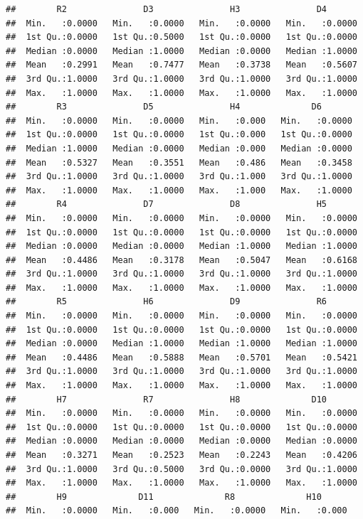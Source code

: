 \documentclass[
]{book}
\begin{document}
\begin{verbatim}
##        R2               D3               H3               D4        
##  Min.   :0.0000   Min.   :0.0000   Min.   :0.0000   Min.   :0.0000  
##  1st Qu.:0.0000   1st Qu.:0.5000   1st Qu.:0.0000   1st Qu.:0.0000  
##  Median :0.0000   Median :1.0000   Median :0.0000   Median :1.0000  
##  Mean   :0.2991   Mean   :0.7477   Mean   :0.3738   Mean   :0.5607  
##  3rd Qu.:1.0000   3rd Qu.:1.0000   3rd Qu.:1.0000   3rd Qu.:1.0000  
##  Max.   :1.0000   Max.   :1.0000   Max.   :1.0000   Max.   :1.0000  
##        R3               D5               H4              D6        
##  Min.   :0.0000   Min.   :0.0000   Min.   :0.000   Min.   :0.0000  
##  1st Qu.:0.0000   1st Qu.:0.0000   1st Qu.:0.000   1st Qu.:0.0000  
##  Median :1.0000   Median :0.0000   Median :0.000   Median :0.0000  
##  Mean   :0.5327   Mean   :0.3551   Mean   :0.486   Mean   :0.3458  
##  3rd Qu.:1.0000   3rd Qu.:1.0000   3rd Qu.:1.000   3rd Qu.:1.0000  
##  Max.   :1.0000   Max.   :1.0000   Max.   :1.000   Max.   :1.0000  
##        R4               D7               D8               H5        
##  Min.   :0.0000   Min.   :0.0000   Min.   :0.0000   Min.   :0.0000  
##  1st Qu.:0.0000   1st Qu.:0.0000   1st Qu.:0.0000   1st Qu.:0.0000  
##  Median :0.0000   Median :0.0000   Median :1.0000   Median :1.0000  
##  Mean   :0.4486   Mean   :0.3178   Mean   :0.5047   Mean   :0.6168  
##  3rd Qu.:1.0000   3rd Qu.:1.0000   3rd Qu.:1.0000   3rd Qu.:1.0000  
##  Max.   :1.0000   Max.   :1.0000   Max.   :1.0000   Max.   :1.0000  
##        R5               H6               D9               R6        
##  Min.   :0.0000   Min.   :0.0000   Min.   :0.0000   Min.   :0.0000  
##  1st Qu.:0.0000   1st Qu.:0.0000   1st Qu.:0.0000   1st Qu.:0.0000  
##  Median :0.0000   Median :1.0000   Median :1.0000   Median :1.0000  
##  Mean   :0.4486   Mean   :0.5888   Mean   :0.5701   Mean   :0.5421  
##  3rd Qu.:1.0000   3rd Qu.:1.0000   3rd Qu.:1.0000   3rd Qu.:1.0000  
##  Max.   :1.0000   Max.   :1.0000   Max.   :1.0000   Max.   :1.0000  
##        H7               R7               H8              D10        
##  Min.   :0.0000   Min.   :0.0000   Min.   :0.0000   Min.   :0.0000  
##  1st Qu.:0.0000   1st Qu.:0.0000   1st Qu.:0.0000   1st Qu.:0.0000  
##  Median :0.0000   Median :0.0000   Median :0.0000   Median :0.0000  
##  Mean   :0.3271   Mean   :0.2523   Mean   :0.2243   Mean   :0.4206  
##  3rd Qu.:1.0000   3rd Qu.:0.5000   3rd Qu.:0.0000   3rd Qu.:1.0000  
##  Max.   :1.0000   Max.   :1.0000   Max.   :1.0000   Max.   :1.0000  
##        H9              D11              R8              H10       
##  Min.   :0.0000   Min.   :0.000   Min.   :0.0000   Min.   :0.000  

\end{verbatim}
\end{document}
